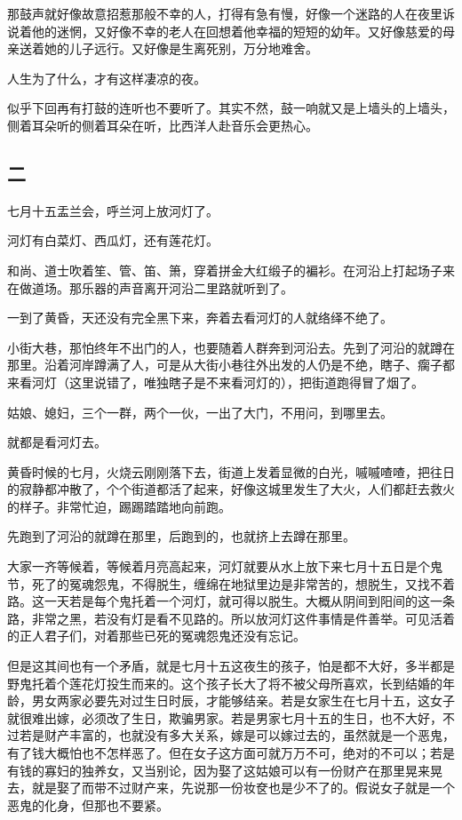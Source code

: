 \documentclass[UTF8]{ctexart}
\begin{document}
那鼓声就好像故意招惹那般不幸的人，打得有急有慢，好像一个迷路的人在夜里诉说着他的迷惘，又好像不幸的老人在回想着他幸福的短短的幼年。又好像慈爱的母亲送着她的儿子远行。又好像是生离死别，万分地难舍。

{人生为了什么，才有这样凄凉的夜。}

似乎下回再有打鼓的连听也不要听了。其实不然，鼓一响就又是上墙头的上墙头，侧着耳朵听的侧着耳朵在听，比西洋人赴音乐会更热心。

\subsection{二}

七月十五盂兰会，呼兰河上放河灯了。

河灯有白菜灯、西瓜灯，还有莲花灯。

和尚、道士吹着笙、管、笛、箫，穿着拼金大红缎子的褊衫。在河沿上打起场子来在做道场。那乐器的声音离开河沿二里路就听到了。

一到了黄昏，天还没有完全黑下来，奔着去看河灯的人就络绎不绝了。

小街大巷，那怕终年不出门的人，也要随着人群奔到河沿去。先到了河沿的就蹲在那里。沿着河岸蹲满了人，可是从大街小巷往外出发的人仍是不绝，瞎子、瘸子都来看河灯（这里说错了，唯独瞎子是不来看河灯的），把街道跑得冒了烟了。

姑娘、媳妇，三个一群，两个一伙，一出了大门，不用问，到哪里去。

就都是看河灯去。

黄昏时候的七月，火烧云刚刚落下去，街道上发着显微的白光，嘁嘁喳喳，把往日的寂静都冲散了，个个街道都活了起来，好像这城里发生了大火，人们都赶去救火的样子。非常忙迫，踢踢踏踏地向前跑。

先跑到了河沿的就蹲在那里，后跑到的，也就挤上去蹲在那里。

大家一齐等候着，等候着月亮高起来，河灯就要从水上放下来七月十五日是个鬼节，死了的冤魂怨鬼，不得脱生，缠绵在地狱里边是非常苦的，想脱生，又找不着路。这一天若是每个鬼托着一个河灯，就可得以脱生。大概从阴间到阳间的这一条路，非常之黑，若没有灯是看不见路的。所以放河灯这件事情是件善举。可见活着的正人君子们，对着那些已死的冤魂怨鬼还没有忘记。

但是这其间也有一个矛盾，就是七月十五这夜生的孩子，怕是都不大好，多半都是野鬼托着个莲花灯投生而来的。这个孩子长大了将不被父母所喜欢，长到结婚的年龄，男女两家必要先对过生日时辰，才能够结亲。若是女家生在七月十五，这女子就很难出嫁，必须改了生日，欺骗男家。若是男家七月十五的生日，也不大好，不过若是财产丰富的，也就没有多大关系，嫁是可以嫁过去的，虽然就是一个恶鬼，有了钱大概怕也不怎样恶了。但在女子这方面可就万万不可，绝对的不可以；若是有钱的寡妇的独养女，又当别论，因为娶了这姑娘可以有一份财产在那里晃来晃去，就是娶了而带不过财产来，先说那一份妆奁也是少不了的。假说女子就是一个恶鬼的化身，但那也不要紧。
\end{document}
